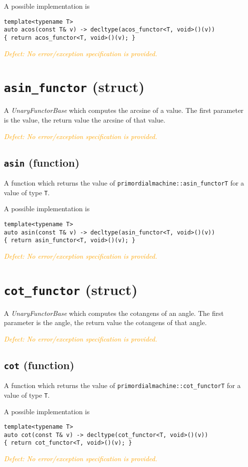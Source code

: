 \documentclass[oneside]{book}
\begin{document}
\noindent{}A possible implementation is
\begin{verbatim}
template<typename T>
auto acos(const T& v) -> decltype(acos_functor<T, void>()(v))
{ return acos_functor<T, void>()(v); }
\end{verbatim}

\noindent{}\textcolor{orange}{\textit{Defect: No error/exception specification is provided.}}
\section{\texttt{asin\_functor} (struct)}
A \textit{UnaryFunctorBase} which computes the
arcsine
of a value.
The first parameter is the value, the return value the arcsine of that value.

\noindent{}\textcolor{orange}{\textit{Defect: No error/exception specification is provided.}}

\subsection{\texttt{asin} (function)}
A function which returns the value of \texttt{primordialmachine::asin\_functor\textlangle T\textrangle}
for a value of type \texttt{T}.

\noindent{}A possible implementation is
\begin{verbatim}
template<typename T>
auto asin(const T& v) -> decltype(asin_functor<T, void>()(v))
{ return asin_functor<T, void>()(v); }
\end{verbatim}

\noindent{}\textcolor{orange}{\textit{Defect: No error/exception specification is provided.}}
\section{\texttt{cot\_functor} (struct)}
A \textit{UnaryFunctorBase} which computes the
cotangens of an angle.
The first parameter is the angle, the return value the cotangens of that angle.

\noindent{}\textcolor{orange}{\textit{Defect: No error/exception specification is provided.}}

\subsection{\texttt{cot} (function)}
A function which returns the value of \texttt{primordialmachine::cot\_functor\textlangle T\textrangle}
for a value of type \texttt{T}.

\noindent{}A possible implementation is
\begin{verbatim}
template<typename T>
auto cot(const T& v) -> decltype(cot_functor<T, void>()(v))
{ return cot_functor<T, void>()(v); }
\end{verbatim}

\noindent{}\textcolor{orange}{\textit{Defect: No error/exception specification is provided.}}
\end{document}
